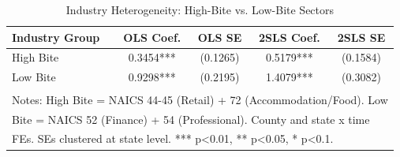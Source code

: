 \begin{table}[!h]
\centering
\caption{\label{tab:industry}Industry Heterogeneity: High-Bite vs. Low-Bite Sectors}
\centering
\begin{tabular}[t]{lcccc}
\toprule
Industry Group & OLS Coef. & OLS SE & 2SLS Coef. & 2SLS SE\\
\midrule
High Bite & 0.3454*** & (0.1265) & 0.5179*** & (0.1584)\\
Low Bite & 0.9298*** & (0.2195) & 1.4079*** & (0.3082)\\
\bottomrule
\multicolumn{5}{l}{\textsuperscript{} Notes: High Bite = NAICS 44-45 (Retail) + 72 (Accommodation/Food). Low}\\
\multicolumn{5}{l}{Bite = NAICS 52 (Finance) + 54 (Professional). County and state x time}\\
\multicolumn{5}{l}{FEs. SEs clustered at state level. *** p<0.01, ** p<0.05, * p<0.1.}\\
\end{tabular}
\end{table}
